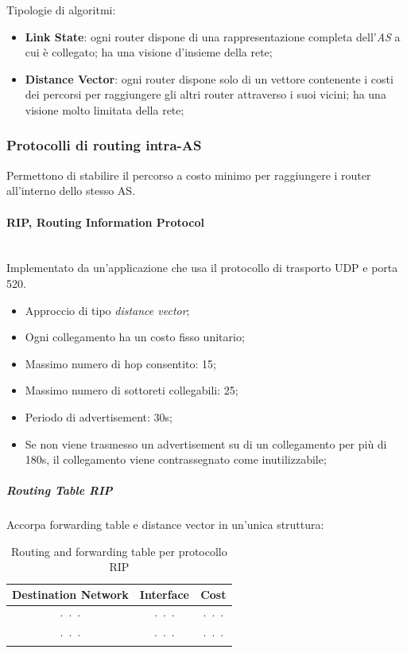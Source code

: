 \documentclass[12pt,a4paper]{article}
\begin{document}
Tipologie di algoritmi:
\begin{itemize}
  \item \textbf{Link State}: ogni router dispone di una rappresentazione
    completa dell'\emph{AS} a cui è collegato; ha una visione d'insieme
    della rete;
  \item \textbf{Distance Vector}: ogni router dispone solo di un vettore
    contenente i costi dei percorsi per raggiungere gli altri router
    attraverso i suoi vicini; ha una visione molto limitata della rete;
\end{itemize}

\subsubsection{Protocolli di routing intra-AS}
Permettono di stabilire il percorso a costo minimo per raggiungere
i router all'interno dello stesso AS.

\paragraph{RIP, Routing Information Protocol}\mbox{}\\
Implementato da un'applicazione che usa il protocollo di trasporto UDP
e porta 520.
\begin{itemize}
  \item Approccio di tipo \emph{distance vector};
  \item Ogni collegamento ha un costo fisso unitario;
  \item Massimo numero di hop consentito: 15;
  \item Massimo numero di sottoreti collegabili: 25;
  \item Periodo di advertisement: 30s;
  \item Se non viene trasmesso un advertisement su di un collegamento
    per più di 180s, il collegamento viene contrassegnato come
    inutilizzabile;
\end{itemize}

\subparagraph{Routing Table RIP}
Accorpa forwarding table e distance vector in un'unica struttura:
\begin{table}[H]
\centering
\begin{tabular}{ c | c | c }
Destination Network & Interface & Cost  \\ \hline
··· & ··· & ··· \\
··· & ··· & ··· \\
\end{tabular}
\caption{Routing and forwarding table per protocollo RIP}
\end{table}
\end{document}
